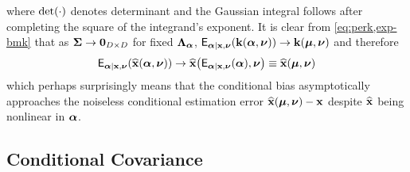 where $\det\paren{\cdot}$ denotes determinant
and the Gaussian integral follows 
after completing the square
of the integrand's exponent.
It is clear 
from \eqref{eq:perk,exp-bmk}
that as $\boldsymbol{\Sigma} \to \boldsymbol{0}_{D\times D}$
for fixed $\boldsymbol{\Lambda}_{\boldsymbol{\alpha}}$,
$\expect{\bmymag|\bmx,\bmnu}{\bmka{\bmymag,\bmnu}}
	\to \bmka{\bmmu,\bmnu}$
and therefore
\begin{align}
	\expect{\bmymag|\bmx,\bmnu}{\esta{\bmx}{\bmymag,\bmnu}}
		\to \esta{\bmx}{\expect{\bmymag|\bmx,\bmnu}{\bmymag},\bmnu}
		\equiv \esta{\bmx}{\bmmu,\bmnu}
\end{align}
which perhaps surprisingly means that 
the conditional bias asymptotically approaches 
the noiseless conditional estimation error $\esta{\bmx}{\bmmu,\bmnu}-\bmx$
despite $\widehat{\mathbf{x}}$ being nonlinear in $\boldsymbol{\alpha}$.

\subsection{Conditional Covariance}
\label{ss,perk,perf,cov}

